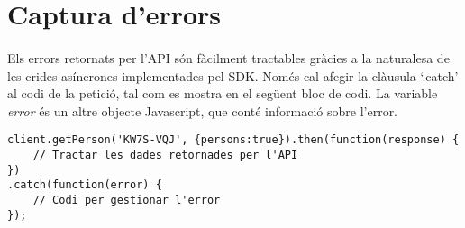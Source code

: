 \section{Captura d'errors}

    \paragraph{}
    Els errors retornats per l'API són fàcilment tractables gràcies a la naturalesa de les crides asíncrones implementades pel SDK. Només cal afegir la clàusula `.catch' al codi de la petició, tal com es mostra en el següent bloc de codi. La variable \emph{error} és un altre objecte Javascript, que conté informació sobre l’error.

\begin{lstlisting}[style=rawOwn,caption={Tractament d'errors amb l'objecte \emph{error}}]
client.getPerson('KW7S-VQJ', {persons:true}).then(function(response) {
    // Tractar les dades retornades per l'API
})
.catch(function(error) {
    // Codi per gestionar l'error
});

\end{lstlisting}
